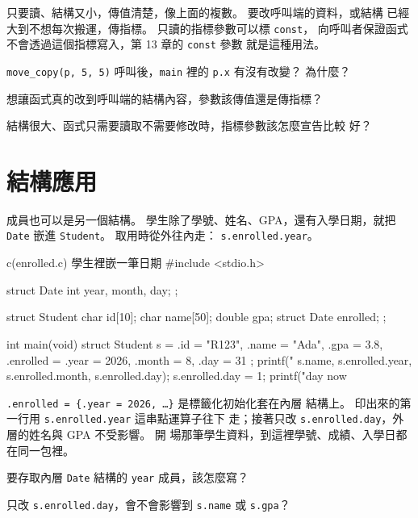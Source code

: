 只要讀、結構又小，傳值清楚，像上面的複數。 要改呼叫端的資料，或結構
已經大到不想每次搬運，傳指標。 只讀的指標參數可以標 \texttt{const}，
向呼叫者保證函式不會透過這個指標寫入，第 13 章的 \texttt{const} 參數
就是這種用法。

\begin{drills}[label=drills:struct-params]
\item \texttt{move\_copy(p, 5, 5)} 呼叫後，\texttt{main} 裡的
\texttt{p.x} 有沒有改變？ 為什麼？
\item 想讓函式真的改到呼叫端的結構內容，參數該傳值還是傳指標？
\item 結構很大、函式只需要讀取不需要修改時，指標參數該怎麼宣告比較
好？
\end{drills}

\section{結構應用}
\label{sec:struct-nested}

成員也可以是另一個結構。 學生除了學號、姓名、GPA，還有入學日期，就把
\texttt{Date} 嵌進 \texttt{Student}。 取用時從外往內走：
\texttt{s.enrolled.year}。

\begin{example}{c}{(enrolled.c) 學生裡嵌一筆日期}
#include <stdio.h>

struct Date {
    int year, month, day;
};

struct Student {
    char id[10];
    char name[50];
    double gpa;
    struct Date enrolled;
};

int main(void) {
    struct Student s = {
        .id = "R123",
        .name = "Ada",
        .gpa = 3.8,
        .enrolled = {.year = 2026, .month = 8, .day = 31}
    };
    printf("%
           s.name, s.enrolled.year,
           s.enrolled.month, s.enrolled.day);
    s.enrolled.day = 1;
    printf("day now %
}
\end{example}


\texttt{.enrolled = \{.year = 2026, \ldots\}} 是標籤化初始化套在內層
結構上。 印出來的第一行用 \texttt{s.enrolled.year} 這串點運算子往下
走；接著只改 \texttt{s.enrolled.day}，外層的姓名與 GPA 不受影響。 開
場那筆學生資料，到這裡學號、成績、入學日都在同一包裡。

\begin{drills}[label=drills:struct-nested]
\item 要存取內層 \texttt{Date} 結構的 \texttt{year} 成員，該怎麼寫？
\item 只改 \texttt{s.enrolled.day}，會不會影響到 \texttt{s.name} 或
\texttt{s.gpa}？
\end{drills}

